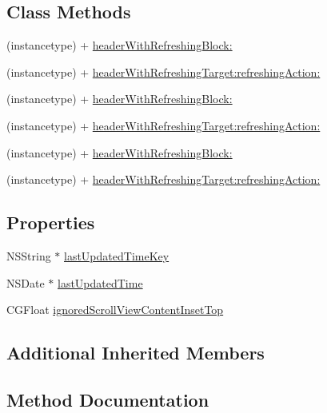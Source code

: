 \subsection*{Class Methods}
\begin{DoxyCompactItemize}
\item 
(instancetype) + \mbox{\hyperlink{interface_m_j_refresh_header_a2ed5c544baf8b03be7e025dac197c868}{header\+With\+Refreshing\+Block\+:}}
\item 
(instancetype) + \mbox{\hyperlink{interface_m_j_refresh_header_af9de32ba8f3b29f93740bb69b279ad85}{header\+With\+Refreshing\+Target\+:refreshing\+Action\+:}}
\item 
(instancetype) + \mbox{\hyperlink{interface_m_j_refresh_header_a2ed5c544baf8b03be7e025dac197c868}{header\+With\+Refreshing\+Block\+:}}
\item 
(instancetype) + \mbox{\hyperlink{interface_m_j_refresh_header_af9de32ba8f3b29f93740bb69b279ad85}{header\+With\+Refreshing\+Target\+:refreshing\+Action\+:}}
\item 
(instancetype) + \mbox{\hyperlink{interface_m_j_refresh_header_a2ed5c544baf8b03be7e025dac197c868}{header\+With\+Refreshing\+Block\+:}}
\item 
(instancetype) + \mbox{\hyperlink{interface_m_j_refresh_header_af9de32ba8f3b29f93740bb69b279ad85}{header\+With\+Refreshing\+Target\+:refreshing\+Action\+:}}
\end{DoxyCompactItemize}
\subsection*{Properties}
\begin{DoxyCompactItemize}
\item 
N\+S\+String $\ast$ \mbox{\hyperlink{interface_m_j_refresh_header_a271857966b0acfdf1be61a05aaf3f0ec}{last\+Updated\+Time\+Key}}
\item 
N\+S\+Date $\ast$ \mbox{\hyperlink{interface_m_j_refresh_header_ad673d647b3f6bbb11230437a7e739c3a}{last\+Updated\+Time}}
\item 
C\+G\+Float \mbox{\hyperlink{interface_m_j_refresh_header_aa0f90fe9697ad8d6bb05b7af894c5444}{ignored\+Scroll\+View\+Content\+Inset\+Top}}
\end{DoxyCompactItemize}
\subsection*{Additional Inherited Members}


\subsection{Method Documentation}
\mbox{\label{interface_m_j_refresh_header_a2ed5c544baf8b03be7e025dac197c868}} 

